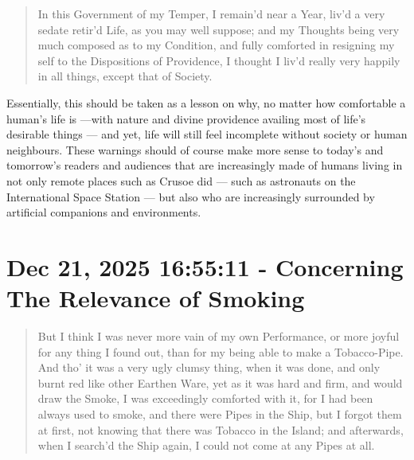 \documentclass[a4paper]{article}
\begin{document}
\noindent
\begin{minipage}{1\textwidth}
\vspace{1em}
\begin{quotation}
{\ttfamily

In this Government of my Temper, I remain’d near a Year, liv’d a very sedate retir’d Life, as you may well suppose; and my Thoughts being very much composed as to my Condition, and fully comforted in resigning my self to the Dispositions of Providence, I thought I liv’d really very happily in all things, except that of Society.

}
\end{quotation}
\vspace{1em}
\end{minipage}



Essentially, this should be taken as a lesson on why, no matter how comfortable a human's life is ---with nature and divine providence availing most of life's desirable things --- and yet, life will still feel incomplete without society or human neighbours. These warnings should of course make more sense to today's and tomorrow's readers and audiences that are increasingly made of humans living in not only remote places such as Crusoe did --- such as astronauts on the International Space Station --- but also who are increasingly surrounded by artificial companions and environments.





\section{Dec 21, 2025 16:55:11 - Concerning The Relevance of Smoking}
\label{SEC35}



\noindent
\begin{minipage}{1\textwidth}
\vspace{1em}
\begin{quotation}
{\ttfamily

But I think I was never more vain of my own Performance, or more joyful for any thing I found out, than for my being able to make a Tobacco-Pipe. And tho’ it was a very ugly clumsy thing, when it was done, and only burnt red like other Earthen Ware, yet as it was hard and firm, and would draw the Smoke, I was exceedingly comforted with it, for I had been always used to smoke, and there were Pipes in the Ship, but I forgot them at first, not knowing that there was Tobacco in the Island; and afterwards, when I search’d the Ship again, I could not come at any Pipes at all.

}
\end{quotation}
\vspace{1em}
\end{minipage}
\end{document}
